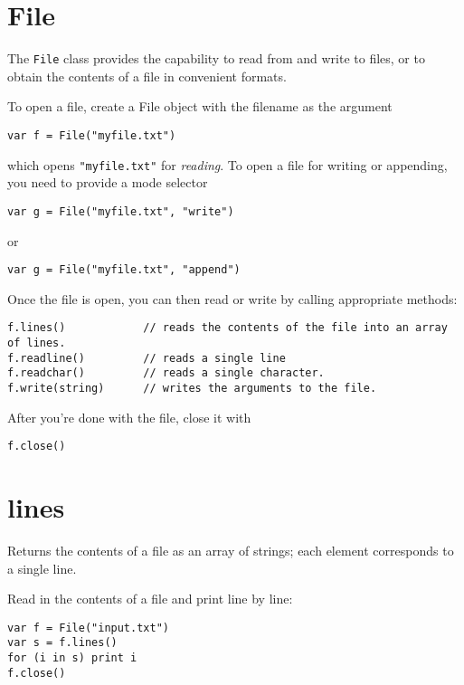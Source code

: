 \hypertarget{file}{%
\section{File}\label{file}}

The \texttt{File} class provides the capability to read from and write
to files, or to obtain the contents of a file in convenient formats.

To open a file, create a File object with the filename as the argument

\begin{lstlisting}
var f = File("myfile.txt")
\end{lstlisting}

which opens \texttt{"myfile.txt"} for \emph{reading}. To open a file for
writing or appending, you need to provide a mode selector

\begin{lstlisting}
var g = File("myfile.txt", "write")
\end{lstlisting}

or

\begin{lstlisting}
var g = File("myfile.txt", "append")
\end{lstlisting}

Once the file is open, you can then read or write by calling appropriate
methods:

\begin{lstlisting}
f.lines()            // reads the contents of the file into an array of lines.
f.readline()         // reads a single line
f.readchar()         // reads a single character.
f.write(string)      // writes the arguments to the file.
\end{lstlisting}

After you're done with the file, close it with

\begin{lstlisting}
f.close()
\end{lstlisting}

\hypertarget{lines}{%
\section{lines}\label{lines}}

Returns the contents of a file as an array of strings; each element
corresponds to a single line.

Read in the contents of a file and print line by line:

\begin{lstlisting}
var f = File("input.txt")
var s = f.lines()
for (i in s) print i
f.close()
\end{lstlisting}


